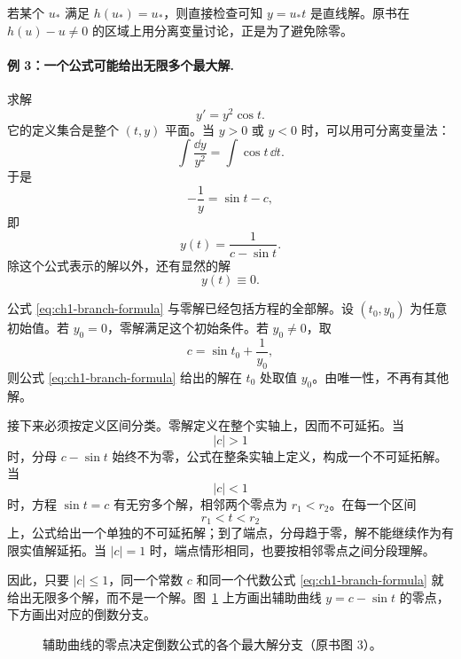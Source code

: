 若某个 \(u_*\) 满足 \(h(u_*)=u_*\)，则直接检查可知 \(y=u_*t\) 是直线解。原书在 \(h(u)-u\neq0\) 的区域上用分离变量讨论，正是为了避免除零。

\paragraph{例 3：一个公式可能给出无限多个最大解.}
求解
\begin{equation}
 y'=y^2\cos t.
 \label{eq:ch1-branch-example}
\end{equation}
它的定义集合是整个 \((t,y)\) 平面。当 \(y>0\) 或 \(y<0\) 时，可以用可分离变量法：
\[
 \int\frac{\dd y}{y^2}=\int\cos t\,\dd t.
\]
于是
\[
 -\frac1y=\sin t-c,
\]
即
\begin{equation}
 y(t)=\frac{1}{c-\sin t}.
 \label{eq:ch1-branch-formula}
\end{equation}
除这个公式表示的解以外，还有显然的解
\begin{equation}
 y(t)\equiv0.
 \label{eq:ch1-zero-solution}
\end{equation}

公式 \eqref{eq:ch1-branch-formula} 与零解已经包括方程的全部解。设 \((t_0,y_0)\) 为任意初始值。若 \(y_0=0\)，零解满足这个初始条件。若 \(y_0\neq0\)，取
\[
 c=\sin t_0+\frac1{y_0},
\]
则公式 \eqref{eq:ch1-branch-formula} 给出的解在 \(t_0\) 处取值 \(y_0\)。由唯一性，不再有其他解。

接下来必须按定义区间分类。零解定义在整个实轴上，因而不可延拓。当
\[
 |c|>1
\]
时，分母 \(c-\sin t\) 始终不为零，公式在整条实轴上定义，构成一个不可延拓解。当
\[
 |c|<1
\]
时，方程 \(\sin t=c\) 有无穷多个解，相邻两个零点为 \(r_1<r_2\)。在每一个区间
\[
 r_1<t<r_2
\]
上，公式给出一个单独的不可延拓解；到了端点，分母趋于零，解不能继续作为有限实值解延拓。当 \(|c|=1\) 时，端点情形相同，也要按相邻零点之间分段理解。

因此，只要 \(|c|\le1\)，同一个常数 \(c\) 和同一个代数公式 \eqref{eq:ch1-branch-formula} 就给出无限多个解，而不是一个解。图~\ref{fig:ch1-branches} 上方画出辅助曲线 \(y=c-\sin t\) 的零点，下方画出对应的倒数分支。

\begin{figure}[H]
 \centering
 \resizebox{0.72\textwidth}{!}{}
 \caption{辅助曲线的零点决定倒数公式的各个最大解分支（原书图 3）。}
 \label{fig:ch1-branches}
\end{figure}

